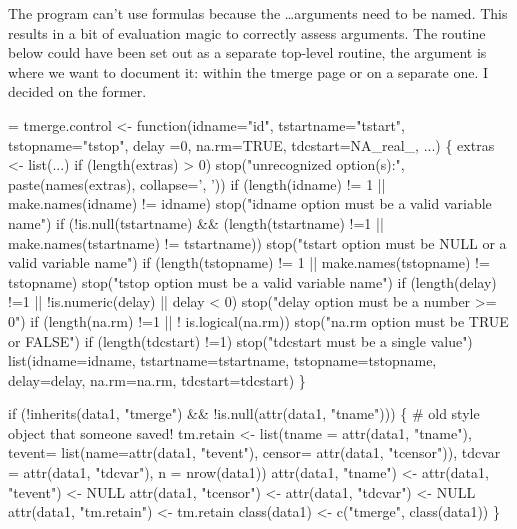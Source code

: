 \documentclass{article}
\begin{document}
The program can't use formulas because the \ldots arguments need to be
named.  This results in a bit of evaluation magic to correctly assess
arguments.  
The routine below could have been set out as a separate top-level routine,
the argument is where we want to document it: within the tmerge page or
on a separate one.
I decided on the former.
\begin{nwchunk}
=
 tmerge.control <- function(idname="id", tstartname="tstart", tstopname="tstop",
                            delay =0, na.rm=TRUE, tdcstart=NA_real_, ...) \{
     extras <- list(...)
     if (length(extras) > 0) 
         stop("unrecognized option(s):", paste(names(extras), collapse=', '))
     if (length(idname) != 1 || make.names(idname) != idname)
         stop("idname option must be a valid variable name")
     if (!is.null(tstartname) && 
         (length(tstartname) !=1 || make.names(tstartname) != tstartname))
         stop("tstart option must be NULL or a valid variable name")
     if (length(tstopname) != 1 || make.names(tstopname) != tstopname)
         stop("tstop option must be a valid variable name") 
     if (length(delay) !=1 || !is.numeric(delay) || delay < 0)
         stop("delay option must be a number >= 0")
     if (length(na.rm) !=1 || ! is.logical(na.rm))
         stop("na.rm option must be TRUE or FALSE")
     if (length(tdcstart) !=1) stop("tdcstart must be a single value")
     list(idname=idname, tstartname=tstartname, tstopname=tstopname, 
          delay=delay, na.rm=na.rm, tdcstart=tdcstart)
 \}
 
 if (!inherits(data1, "tmerge") && !is.null(attr(data1, "tname"))) \{
     # old style object that someone saved!
     tm.retain <- list(tname = attr(data1, "tname"),
                       tevent= list(name=attr(data1, "tevent"),
                                    censor= attr(data1, "tcensor")),
                       tdcvar = attr(data1, "tdcvar"),
                       n = nrow(data1))
     attr(data1, "tname") <- attr(data1, "tevent") <- NULL
     attr(data1, "tcensor") <- attr(data1, "tdcvar") <- NULL
     attr(data1, "tm.retain") <- tm.retain
     class(data1) <- c("tmerge", class(data1))
 \}
                       

\end{nwchunk}
\end{document}
